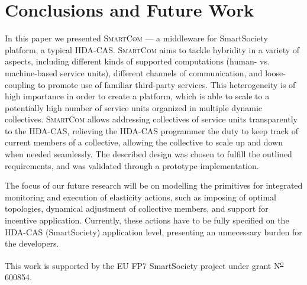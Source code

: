 \documentclass{llncs}
\newcommand{\mdl}{\textsc{SmartCom}}
\begin{document}
\section{Conclusions and Future Work}
\label{sec:conclusion}

  In this paper we presented \mdl{} --- a middleware for SmartSociety platform, a typical HDA-CAS. \mdl{} aims to tackle hybridity in a variety of aspects, including different kinds of supported computations (human- vs. machine-based service units), different channels of communication, and loose-coupling to promote use of familiar third-party services. This heterogeneity is of high importance in order to create a platform, which is able to scale to a potentially high number of service units organized in multiple dynamic collectives. \mdl{} allows addressing collectives of service units transparently to the HDA-CAS, relieving the HDA-CAS programmer the duty to keep track of current members of a collective, allowing the collective to scale up and down when needed seamlessly. The described design was chosen to fulfill the outlined requirements, and was validated through a prototype implementation. 

  The focus of our future research will be on modelling the primitives for integrated monitoring and execution of elasticity actions, such as imposing of optimal topologies, dynamical adjustment of collective members, and support for incentive application. Currently, these actions have to be fully specified on the HDA-CAS (SmartSociety) application level, presenting an unnecessary burden for the developers.







This work is supported by the EU FP7 SmartSociety project under grant N\textsuperscript{\underline{o}} 600854.


\end{document}
